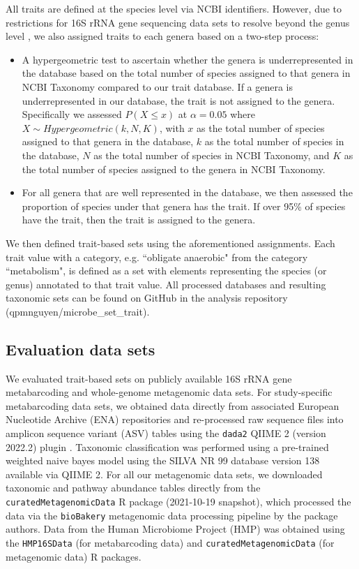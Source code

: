 \documentclass{bmcart}
\begin{document}
\noindent All traits are defined at the species level via NCBI identifiers. However, due to restrictions for 16S rRNA gene sequencing data sets to resolve beyond the genus level \cite{johnson2019evaluation}, we also assigned traits to each genera based on a two-step process: 
\begin{itemize}
    \item A hypergeometric test to ascertain whether the genera is underrepresented in the database based on the total number of species assigned to that genera in NCBI Taxonomy \cite{schoch2020ncbi} compared to our trait database. If a genera is underrepresented in our database, the trait is not assigned to the genera. Specifically we assessed $P(X \leq x)$ at $\alpha = 0.05$ where $X \sim Hypergeometric(k, N, K)$, with $x$ as the total number of species assigned to that genera in the database, $k$ as the total number of species in the database, $N$ as the total number of species in NCBI Taxonomy, and $K$ as the total number of species assigned to the genera in NCBI Taxonomy.
    \item For all genera that are well represented in the database, we then assessed the proportion of species under that genera has the trait. If over 95\% of species have the trait, then the trait is assigned to the genera. 
\end{itemize}

\noindent We then defined trait-based sets using the aforementioned assignments. Each trait value with a category, e.g. ``obligate anaerobic" from the category ``metabolism", is defined as a set with elements representing the species (or genus) annotated to that trait value. All processed databases and resulting taxonomic sets can be found on GitHub in the analysis repository (qpmnguyen/microbe\_set\_trait). 

\subsection*{Evaluation data sets}  \label{data sources}
We evaluated trait-based sets on publicly available 16S rRNA gene metabarcoding and whole-genome metagenomic data sets. For study-specific metabarcoding data sets, we obtained data directly from associated European Nucleotide Archive (ENA) repositories and re-processed raw sequence files into amplicon sequence variant (ASV) tables using the \texttt{dada2} QIIME 2 (version 2022.2) plugin \cite{callahan2016dada2, boylen2019reproducible}. Taxonomic classification was performed using a pre-trained weighted naive bayes model \cite{} using the SILVA NR 99 database version 138 \cite{quast2013silva} available via QIIME 2. For all our metagenomic data sets, we downloaded taxonomic and pathway abundance tables directly from the \texttt{curatedMetagenomicData} R package \cite{pasolli2017accessible} (2021-10-19 snapshot), which processed the data via the \texttt{bioBakery} \cite{beghini2021integrating} metagenomic data processing pipeline by the package authors. Data from the Human Microbiome Project (HMP) was obtained using the \texttt{HMP16SData} \cite{schiffer2019hmp16sdata} (for metabarcoding data) and \texttt{curatedMetagenomicData} \cite{pasolli2017accessible} (for metagenomic data) R packages.   
 
\end{document}
